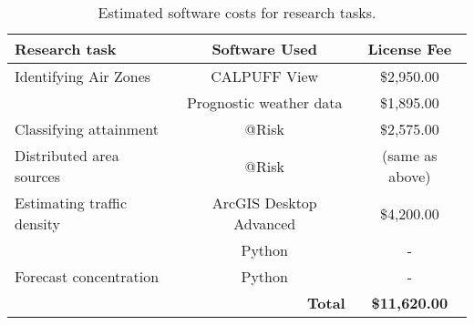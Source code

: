 \begin{table}[]
\centering
\caption{Estimated software costs for research tasks.}
\label{tb:projcosts}
\begin{tabular}{@{}lcc@{}}
\toprule
\textbf{Research task} & \textbf{Software Used} & \textbf{License Fee} \\ \midrule
Identifying Air Zones & CALPUFF View & \$2,950.00 \\
 & Prognostic weather data & \$1,895.00 \\ \midrule
Classifying attainment & @Risk & \$2,575.00 \\ \midrule
Distributed area sources & @Risk & (same as above) \\ \midrule
Estimating traffic density & ArcGIS Desktop Advanced & \$4,200.00 \\
 & Python & - \\ \midrule
Forecast concentration & Python & - \\
 & \multicolumn{1}{r}{\textbf{Total}} & \textbf{\$11,620.00} \\ \bottomrule
\end{tabular}
\end{table}